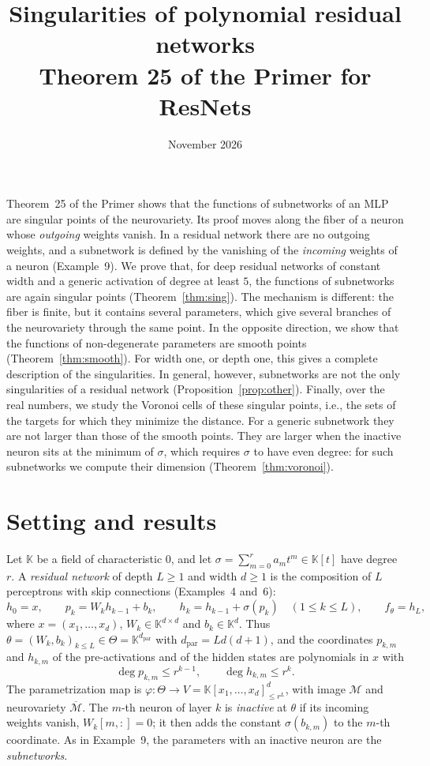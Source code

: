 \documentclass[11pt]{article}
\title{Singularities of polynomial residual networks\\[4pt]\large Theorem 25 of the Primer for ResNets}
\author{}
\date{November 2026}
\theoremstyle{definition}
\theoremstyle{remark}
\newcommand{\K}{\mathbb{K}}
\newcommand{\M}{\mathcal{M}}
\newcommand{\Mbar}{\overline{\M}}
\newcommand{\dpar}{d_{\mathrm{par}}}
\begin{document}
\maketitle

\noindent
Theorem~25 of the Primer shows that the functions of subnetworks of an MLP are singular points of the neurovariety. Its proof moves along the fiber of a neuron whose \emph{outgoing} weights vanish. In a residual network there are no outgoing weights, and a subnetwork is defined by the vanishing of the \emph{incoming} weights of a neuron (Example~9). We prove that, for deep residual networks of constant width and a generic activation of degree at least $5$, the functions of subnetworks are again singular points (Theorem~\ref{thm:sing}). The mechanism is different: the fiber is finite, but it contains several parameters, which give several branches of the neurovariety through the same point. In the opposite direction, we show that the functions of non-degenerate parameters are smooth points (Theorem~\ref{thm:smooth}). For width one, or depth one, this gives a complete description of the singularities. In general, however, subnetworks are not the only singularities of a residual network (Proposition~\ref{prop:other}). Finally, over the real numbers, we study the Voronoi cells of these singular points, i.e., the sets of the targets for which they minimize the distance. For a generic subnetwork they are not larger than those of the smooth points. They are larger when the inactive neuron sits at the minimum of $\sigma$, which requires $\sigma$ to have even degree: for such subnetworks we compute their dimension (Theorem~\ref{thm:voronoi}).

\section{Setting and results}

Let $\K$ be a field of characteristic $0$, and let $\sigma=\sum_{m=0}^ra_mt^m\in\K[t]$ have degree $r$. A \emph{residual network} of depth $L\ge1$ and width $d\ge1$ is the composition of $L$ perceptrons with skip connections (Examples~4 and~6):
\[
h_0=x,\qquad p_k=W_kh_{k-1}+b_k,\qquad h_k=h_{k-1}+\sigma(p_k)\quad(1\le k\le L),\qquad f_\theta=h_L,
\]
where $x=(x_1,\dots,x_d)$, $W_k\in\K^{d\times d}$ and $b_k\in\K^d$. Thus $\theta=(W_k,b_k)_{k\le L}\in\Theta=\K^{\dpar}$ with $\dpar=Ld(d+1)$, and the coordinates $p_{k,m}$ and $h_{k,m}$ of the pre-activations and of the hidden states are polynomials in $x$ with
\[
\deg p_{k,m}\le r^{k-1},\qquad\deg h_{k,m}\le r^k.
\]
The parametrization map is $\varphi\colon\Theta\to V=\K[x_1,\dots,x_d]^d_{\le r^L}$, with image $\M$ and neurovariety $\Mbar$. The $m$-th neuron of layer $k$ is \emph{inactive} at $\theta$ if its incoming weights vanish, $W_k[m,:]=0$; it then adds the constant $\sigma(b_{k,m})$ to the $m$-th coordinate. As in Example~9, the parameters with an inactive neuron are the \emph{subnetworks}.
\end{document}
